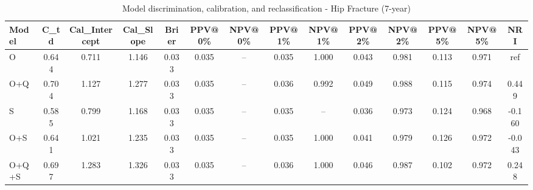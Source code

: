\begin{table}[htbp]
\centering
\small
\caption{Model discrimination, calibration, and reclassification - Hip Fracture (7-year)}
\label{tab:perf_pd_7y}
\begin{tabular}{lccccccccccccc}
\toprule
Model & C\_td & Cal\_Intercept & Cal\_Slope & Brier & PPV@0\% & NPV@0\% & PPV@1\% & NPV@1\% & PPV@2\% & NPV@2\% & PPV@5\% & NPV@5\% & NRI \\
\midrule
O & 0.644 & 0.711 & 1.146 & 0.033 & 0.035 & -- & 0.035 & 1.000 & 0.043 & 0.981 & 0.113 & 0.971 & ref \\
O+Q & 0.704 & 1.127 & 1.277 & 0.033 & 0.035 & -- & 0.036 & 0.992 & 0.049 & 0.988 & 0.115 & 0.974 & 0.449 \\
S & 0.585 & 0.799 & 1.168 & 0.033 & 0.035 & -- & 0.035 & -- & 0.036 & 0.973 & 0.124 & 0.968 & -0.160 \\
O+S & 0.641 & 1.021 & 1.235 & 0.033 & 0.035 & -- & 0.035 & 1.000 & 0.041 & 0.979 & 0.126 & 0.972 & -0.043 \\
O+Q+S & 0.697 & 1.283 & 1.326 & 0.033 & 0.035 & -- & 0.036 & 1.000 & 0.046 & 0.987 & 0.102 & 0.972 & 0.248 \\
\bottomrule
\end{tabular}
\end{table}